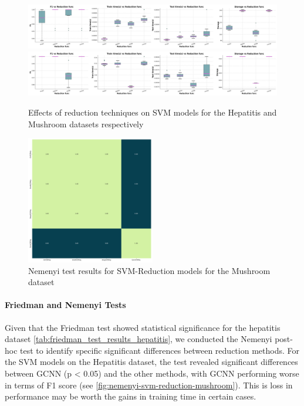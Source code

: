 \begin{figure}
    \centering
    \includegraphics[width=\textwidth]{figures/SVM_reduction_effects_hepatitis.png}
    \includegraphics[width=\textwidth]{figures/SVM_reduction_effects_mushroom.png}
    \caption{Effects of reduction techniques on SVM models for the Hepatitis and Mushroom datasets respectively}
    \label{fig:SVM-reduction-effects}
\end{figure}

\begin{figure}
    \centering
    \includegraphics[width=0.5\textwidth]{figures/nemenyi_test_results_SVM_Reduction_mushroom.png}
    \caption{Nemenyi test results for SVM-Reduction models for the Mushroom dataset}
    \label{fig:nemenyi-svm-reduction-mushroom}
\end{figure}




\paragraph{Friedman and Nemenyi Tests} Given that the Friedman test showed statistical significance for the hepatitis dataset \autoref{tab:friedman_test_results_hepatitis}, we conducted the Nemenyi post-hoc test to identify specific significant differences between reduction methods. 
For the SVM models on the Hepatitis dataset, the test revealed significant differences between GCNN (p < 0.05) and the other methods, with GCNN performing worse in terms of F1 score (see \autoref{fig:nemenyi-svm-reduction-mushroom}).
This is loss in performance may be worth the gains in training time in certain cases.

